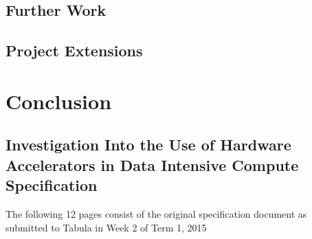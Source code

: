 \documentclass[12pt,a4paper]{article}
\begin{document}
        \subsection{Further Work}
        \label{sub:further_work}
        
        
        \subsection{Project Extensions}
        \label{sub:project_extensions}
        
        
    \section{Conclusion}
    \label{sec:conclusion}
    

	\printbibliography
	
	\begin{appendix}
	    \section{Investigation Into the Use of Hardware Accelerators in Data Intensive Compute Specification}
	    The following 12 pages consist of the original specification document as submitted to Tabula in Week 2 of Term 1, 2015
	    \label{app:specification}
	    
	        
	\end{appendix}
\end{document}
